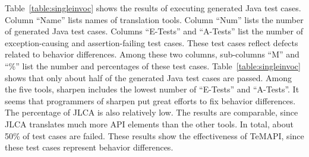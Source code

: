 Table~\ref{table:singleinvoc} shows the results of executing generated Java test cases. Column ``Name'' lists names of translation tools. Column ``Num'' lists the number of generated Java test cases. Columns ``E-Tests'' and ``A-Tests'' list the number of exception-causing and assertion-failing test cases. These test cases reflect defects related to behavior differences. Among these two columns, sub-columns ``M'' and ``\%'' list the number and percentages of these test cases. Table~\ref{table:singleinvoc} shows that only about half of the generated Java test cases are passed. Among the five tools, sharpen includes the lowest number of ``E-Tests'' and ``A-Tests''. It seems that programmers of sharpen put great efforts to fix behavior differences. The percentage of JLCA is also relatively low. The results are comparable, since JLCA translates much more API elements than the other tools. In total, about 50\% of test cases are failed. These results show the effectiveness of TeMAPI, since these test cases represent behavior differences.

